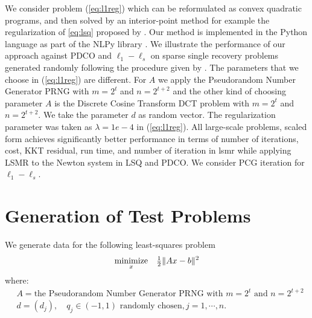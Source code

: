 \documentclass{amsart}
\begin{document}
We consider problem (\ref{eq:l1reg}) which can be reformulated as convex quadratic programs, and then solved by an interior-point method for example the regularization of \eqref{eq:lsq} proposed by
\cite{friedlander-orban-2012}. Our method is implemented in the Python
language as part of the \textsf{NLPy} library \citep{orban-2012}. We illustrate the performance of our approach against PDCO and $\ell_1-\ell_s$  on sparse single recovery problems generated randomly following the procedure given by \cite{kim-koh-lustig-boyd-gorinevsky-2007}. 
The parameters that we choose in (\ref{eq:l1reg}) are different. For $A$ we apply the Pseudorandom Number Generator PRNG with $m=2^t$ and $n=2^{t+2}$ and the other kind of choosing parameter $A$ is the Discrete Cosine Transform DCT problem with $m=2^t$ and $n=2^{t+2}$. We take the parameter $d$ as random vector. The regularization parameter  was taken as $\lambda =1e-4$ in (\ref{eq:l1reg}).
All large-scale  problems,  scaled form  achieves significantly better performance in terms of   number of iterations, cost, KKT residual, run time, and number of iteration in lsmr   while applying LSMR to the Newton system in LSQ and PDCO. We consider  PCG iteration for $\ell_1-\ell_s$.

 \section{Generation of Test Problems}
We generate  data for the following least-squares problem
\begin{equation}
\label{eq:first-class}
\underset{x} {\text{minimize}}       \quad     \tfrac{1}{2}\|Ax-b\|^2 
\end{equation}
where:%
\begin{equation}
\label{eq:first}
\begin{aligned}
&A= \text{the Pseudorandom Number Generator PRNG with $m=2^t$ and $n=2^{t+2}$}\\ 
&d=(d_j),\quad q_{j}\in(-1,1) \text{ randomly chosen}, j=1,\cdots,n.\\
  \end{aligned}
\end{equation}





\end{document}
